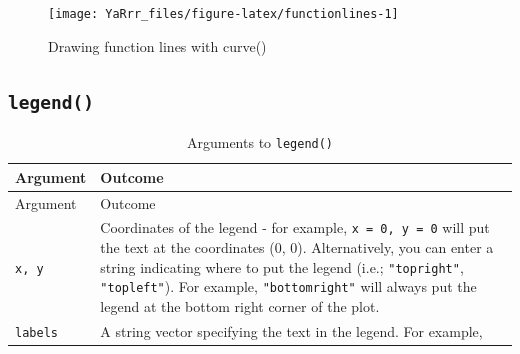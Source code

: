\documentclass[]{book}
\theoremstyle{definition}
\theoremstyle{definition}
\theoremstyle{remark}
\begin{document}
\begin{figure}

{\centering \texttt{[image: YaRrr\_files/figure-latex/functionlines-1]} 

}

\caption{Drawing function lines with curve()}\label{fig:functionlines}
\end{figure}

\subsection{\texorpdfstring{\texttt{legend()}}{legend()}}\label{legend}

\begin{longtable}[]{@{}ll@{}}
\caption{\label{tab:legendarguments} Arguments to
\texttt{legend()}}\tabularnewline
\toprule
\begin{minipage}[b]{0.14\columnwidth}\raggedright\strut
Argument\strut
\end{minipage} & \begin{minipage}[b]{0.71\columnwidth}\raggedright\strut
Outcome\strut
\end{minipage}\tabularnewline
\midrule
\endfirsthead
\toprule
\begin{minipage}[b]{0.14\columnwidth}\raggedright\strut
Argument\strut
\end{minipage} & \begin{minipage}[b]{0.71\columnwidth}\raggedright\strut
Outcome\strut
\end{minipage}\tabularnewline
\midrule
\endhead
\begin{minipage}[t]{0.14\columnwidth}\raggedright\strut
\texttt{x,\ y}\strut
\end{minipage} & \begin{minipage}[t]{0.71\columnwidth}\raggedright\strut
Coordinates of the legend - for example, \texttt{x\ =\ 0,\ y\ =\ 0} will
put the text at the coordinates (0, 0). Alternatively, you can enter a
string indicating where to put the legend (i.e.; \texttt{"topright"},
\texttt{"topleft"}). For example, \texttt{"bottomright"} will always put
the legend at the bottom right corner of the plot.\strut
\end{minipage}\tabularnewline
\begin{minipage}[t]{0.14\columnwidth}\raggedright\strut
\texttt{labels}\strut
\end{minipage} & \begin{minipage}[t]{0.71\columnwidth}\raggedright\strut
A string vector specifying the text in the legend. For example,

\end{minipage}
\end{longtable}
\end{document}
